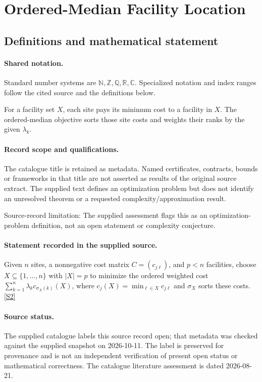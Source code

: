 \documentclass[11pt]{article}
\newcommand{\sref}[2]{\hyperlink{source:#1:#2}{[S#2]}}
\begin{document}
\section{Ordered-Median Facility Location}\label{statement}

\subsection{Definitions and mathematical statement}

\paragraph{Shared notation.}Standard number systems are $\mathbb N,\mathbb Z,\mathbb Q,\mathbb R,\mathbb C$. Specialized notation and index ranges follow the cited source and the definitions below.


For a facility set $X$, each site pays its minimum cost to a facility in $X$. The ordered-median objective sorts those site costs and weights their ranks by the given $\lambda_k$.
\paragraph{Record scope and qualifications.}
The catalogue title is retained as metadata. Named certificates, contracts, bounds or frameworks in that title are not asserted as results of the original source extract.
The supplied text defines an optimization problem but does not identify an unresolved theorem or a requested complexity/approximation result.

Source-record limitation: The supplied assessment flags this as an optimization-problem definition, not an open statement or complexity conjecture.
\paragraph{Statement recorded in the supplied source.}
Given $n$ sites, a nonnegative cost matrix $C=(c_{j\ell})$, and $p<n$ facilities, choose $X\subseteq\{1,\ldots,n\}$ with $|X|=p$ to minimize the ordered weighted cost $\sum_{k=1}^n\lambda_k c_{\sigma_X(k)}(X)$, where $c_j(X)=\min_{\ell\in X}c_{j\ell}$ and $\sigma_X$ sorts these costs. \sref{statement}{2}
\paragraph{Source status.}
The supplied catalogue labels this source record open; that metadata was checked against the supplied snapshot on 2026-10-11. The label is preserved for provenance and is not an independent verification of present open status or mathematical correctness. The catalogue literature assessment is dated 2026-08-21.
\end{document}
